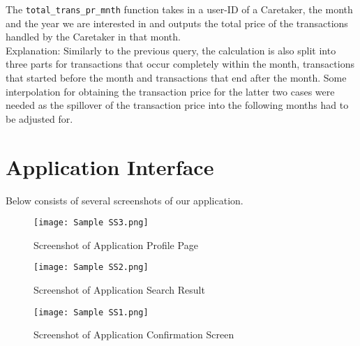 \documentclass[10pt]{article}
\begin{document}
The \texttt{total\_trans\_pr\_mnth} function takes in a user-ID of a Caretaker, the month and the year we are interested in and outputs the total price of the transactions handled by the Caretaker in that month. \\

Explanation: Similarly to the previous query, the calculation is also split into three parts for transactions that occur completely within the month, transactions that started before the month and transactions that end after the month. Some interpolation for obtaining the transaction price for the latter two cases were needed as the spillover of the transaction price into the following months had to be adjusted for.




\newpage


\section{Application Interface}
Below consists of several screenshots of our application.
\begin{figure}[htp]
    \centering
    \texttt{[image: Sample SS3.png]}
    \caption{Screenshot of Application Profile Page}
\end{figure} 
\begin{figure}[htp]
    \centering
    \texttt{[image: Sample SS2.png]}
    \caption{Screenshot of Application Search Result}
\end{figure} 
\begin{figure}[htp]
    \centering
    \texttt{[image: Sample SS1.png]}
    \caption{Screenshot of Application Confirmation Screen}
\end{figure} 
\end{document}
